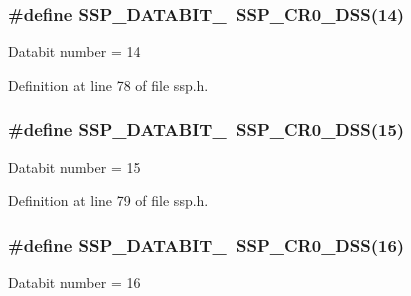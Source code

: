 \subsubsection[{\texorpdfstring{S\+S\+P\+\_\+\+D\+A\+T\+A\+B\+I\+T\+\_\+14}{SSP_DATABIT_14}}]{\setlength{\rightskip}{0pt plus 5cm}\#define S\+S\+P\+\_\+\+D\+A\+T\+A\+B\+I\+T\+\_~{\bf S\+S\+P\+\_\+\+C\+R0\+\_\+\+D\+SS}(14)}\hypertarget{group___s_s_p___public___macros_ga23092c43aa47e79b5c540e1c8bcfb43f}{}\label{group___s_s_p___public___macros_ga23092c43aa47e79b5c540e1c8bcfb43f}
Databit number = 14 

Definition at line 78 of file ssp.\+h.

\subsubsection[{\texorpdfstring{S\+S\+P\+\_\+\+D\+A\+T\+A\+B\+I\+T\+\_\+15}{SSP_DATABIT_15}}]{\setlength{\rightskip}{0pt plus 5cm}\#define S\+S\+P\+\_\+\+D\+A\+T\+A\+B\+I\+T\+\_~{\bf S\+S\+P\+\_\+\+C\+R0\+\_\+\+D\+SS}(15)}\hypertarget{group___s_s_p___public___macros_gafb96efb2ad42b6804003beb416bf513f}{}\label{group___s_s_p___public___macros_gafb96efb2ad42b6804003beb416bf513f}
Databit number = 15 

Definition at line 79 of file ssp.\+h.

\subsubsection[{\texorpdfstring{S\+S\+P\+\_\+\+D\+A\+T\+A\+B\+I\+T\+\_\+16}{SSP_DATABIT_16}}]{\setlength{\rightskip}{0pt plus 5cm}\#define S\+S\+P\+\_\+\+D\+A\+T\+A\+B\+I\+T\+\_~{\bf S\+S\+P\+\_\+\+C\+R0\+\_\+\+D\+SS}(16)}\hypertarget{group___s_s_p___public___macros_ga8a5285b118c9dc1a7f2ce6c4caa3b962}{}\label{group___s_s_p___public___macros_ga8a5285b118c9dc1a7f2ce6c4caa3b962}
Databit number = 16 

